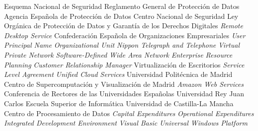 {\begin{acronym}[XXXXXXXX]
       {Esquema Nacional de Seguridad}
      {Reglamento General de Protección de Datos}
      {Agencia Española de Protección de Datos}
       {Centro Nacional de Seguridad}
   {Ley Orgánica de Protección de Datos y Garantía de los Derechos Digitales}
       {\textit{Remote Desktop Service}}
      {Confederación Española de Organizaciones Empresariales}
       {\textit{User Principal Name}}
        {\textit{Organizational Unit}}
       {\textit{Nippon Telegraph and Telephone}}
       {\textit{Virtual Private Network}}
    {\textit{Software-Defined Wide Area Network}}
       {\textit{Enterprise Resource Planning}}
       {\textit{Customer Relationship Manager}}
       {Virtualización de Escritorios}
       {\textit{Service Level Agreement}}
       {\textit{Unified Cloud Services}}
       {Universidad Politécnica de Madrid}
   {Centro de Supercomputación y Visualización de Madrid}
       {\textit{Amazon Web Services}}
      {Conferencia de Rectores de las Universidades Españolas}
      {Universidad Rey Juan Carlos}
       {Escuela Superior de Informática}
      {Universidad de Castilla-La Mancha}
       {Centro de Procesamiento de Datos}
     {\textit{Capital Expenditures}}
      {\textit{Operational Expenditures}}
       {\textit{Integrated Development Environment}}
        {\textit{Visual Basic}}
       {\textit{Universal Windows Platform}}
\end{acronym}
}




